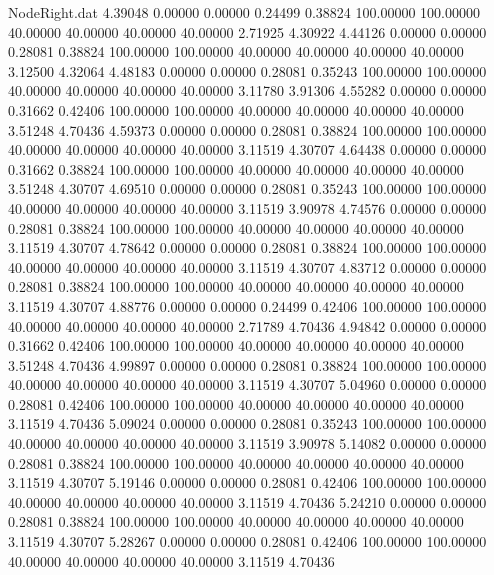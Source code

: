 \begin{filecontents}{NodeRight.dat}
   4.39048    0.00000    0.00000     0.24499    0.38824  100.00000  100.00000   40.00000   40.00000   40.00000   40.00000    2.71925    4.30922
   4.44126    0.00000    0.00000     0.28081    0.38824  100.00000  100.00000   40.00000   40.00000   40.00000   40.00000    3.12500    4.32064
   4.48183    0.00000    0.00000     0.28081    0.35243  100.00000  100.00000   40.00000   40.00000   40.00000   40.00000    3.11780    3.91306
   4.55282    0.00000    0.00000     0.31662    0.42406  100.00000  100.00000   40.00000   40.00000   40.00000   40.00000    3.51248    4.70436
   4.59373    0.00000    0.00000     0.28081    0.38824  100.00000  100.00000   40.00000   40.00000   40.00000   40.00000    3.11519    4.30707
   4.64438    0.00000    0.00000     0.31662    0.38824  100.00000  100.00000   40.00000   40.00000   40.00000   40.00000    3.51248    4.30707
   4.69510    0.00000    0.00000     0.28081    0.35243  100.00000  100.00000   40.00000   40.00000   40.00000   40.00000    3.11519    3.90978
   4.74576    0.00000    0.00000     0.28081    0.38824  100.00000  100.00000   40.00000   40.00000   40.00000   40.00000    3.11519    4.30707
   4.78642    0.00000    0.00000     0.28081    0.38824  100.00000  100.00000   40.00000   40.00000   40.00000   40.00000    3.11519    4.30707
   4.83712    0.00000    0.00000     0.28081    0.38824  100.00000  100.00000   40.00000   40.00000   40.00000   40.00000    3.11519    4.30707
   4.88776    0.00000    0.00000     0.24499    0.42406  100.00000  100.00000   40.00000   40.00000   40.00000   40.00000    2.71789    4.70436
   4.94842    0.00000    0.00000     0.31662    0.42406  100.00000  100.00000   40.00000   40.00000   40.00000   40.00000    3.51248    4.70436
   4.99897    0.00000    0.00000     0.28081    0.38824  100.00000  100.00000   40.00000   40.00000   40.00000   40.00000    3.11519    4.30707
   5.04960    0.00000    0.00000     0.28081    0.42406  100.00000  100.00000   40.00000   40.00000   40.00000   40.00000    3.11519    4.70436
   5.09024    0.00000    0.00000     0.28081    0.35243  100.00000  100.00000   40.00000   40.00000   40.00000   40.00000    3.11519    3.90978
   5.14082    0.00000    0.00000     0.28081    0.38824  100.00000  100.00000   40.00000   40.00000   40.00000   40.00000    3.11519    4.30707
   5.19146    0.00000    0.00000     0.28081    0.42406  100.00000  100.00000   40.00000   40.00000   40.00000   40.00000    3.11519    4.70436
   5.24210    0.00000    0.00000     0.28081    0.38824  100.00000  100.00000   40.00000   40.00000   40.00000   40.00000    3.11519    4.30707
   5.28267    0.00000    0.00000     0.28081    0.42406  100.00000  100.00000   40.00000   40.00000   40.00000   40.00000    3.11519    4.70436

\end{filecontents}
